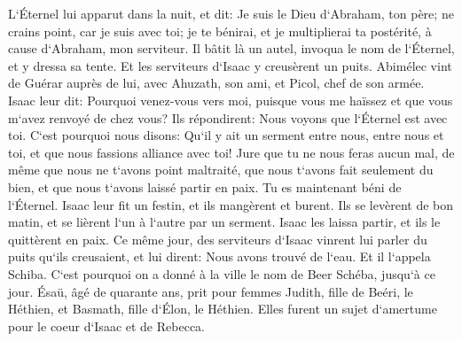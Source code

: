 \verse L`Éternel lui apparut dans la nuit, et dit: Je suis le Dieu d`Abraham, ton père; ne crains point, car je suis avec toi; je te bénirai, et je multiplierai ta postérité, à cause d`Abraham, mon serviteur. 
\verse Il bâtit là un autel, invoqua le nom de l`Éternel, et y dressa sa tente. Et les serviteurs d`Isaac y creusèrent un puits. 
\verse Abimélec vint de Guérar auprès de lui, avec Ahuzath, son ami, et Picol, chef de son armée. 
\verse Isaac leur dit: Pourquoi venez-vous vers moi, puisque vous me haïssez et que vous m`avez renvoyé de chez vous? 
\verse Ils répondirent: Nous voyons que l`Éternel est avec toi. C`est pourquoi nous disons: Qu`il y ait un serment entre nous, entre nous et toi, et que nous fassions alliance avec toi! 
\verse Jure que tu ne nous feras aucun mal, de même que nous ne t`avons point maltraité, que nous t`avons fait seulement du bien, et que nous t`avons laissé partir en paix. Tu es maintenant béni de l`Éternel. 
\verse Isaac leur fit un festin, et ils mangèrent et burent. 
\verse Ils se levèrent de bon matin, et se lièrent l`un à l`autre par un serment. Isaac les laissa partir, et ils le quittèrent en paix. 
\verse Ce même jour, des serviteurs d`Isaac vinrent lui parler du puits qu`ils creusaient, et lui dirent: Nous avons trouvé de l`eau. 
\verse Et il l`appela Schiba. C`est pourquoi on a donné à la ville le nom de Beer Schéba, jusqu`à ce jour. 
\verse Ésaü, âgé de quarante ans, prit pour femmes Judith, fille de Beéri, le Héthien, et Basmath, fille d`Élon, le Héthien. 
\verse Elles furent un sujet d`amertume pour le coeur d`Isaac et de Rebecca. 

